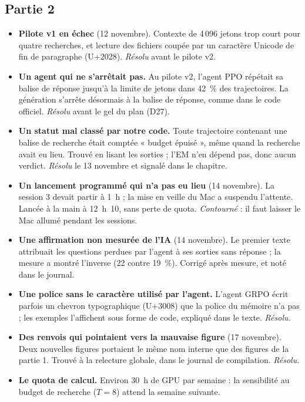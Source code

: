 \documentclass[10pt,a4paper]{article}
\begin{document}
\subsection*{Partie 2}
\begin{itemize}
\item \textbf{Pilote v1 en échec} (12 novembre). Contexte de 4\,096 jetons trop court pour quatre recherches, et lecture des fichiers coupée par un caractère Unicode de fin de paragraphe (U+2028). \emph{Résolu} avant le pilote v2.
\item \textbf{Un agent qui ne s'arrêtait pas.} Au pilote v2, l'agent PPO répétait sa balise de réponse jusqu'à la limite de jetons dans 42~\% des trajectoires. La génération s'arrête désormais à la balise de réponse, comme dans le code officiel. \emph{Résolu} avant le gel du plan (D27).
\item \textbf{Un statut mal classé par notre code.} Toute trajectoire contenant une balise de recherche était comptée « budget épuisé », même quand la recherche avait eu lieu. Trouvé en lisant les sorties ; l'EM n'en dépend pas, donc aucun verdict. \emph{Résolu} le 13 novembre et signalé dans le chapitre.
\item \textbf{Un lancement programmé qui n'a pas eu lieu} (14 novembre). La session 3 devait partir à 1~h ; la mise en veille du Mac a suspendu l'attente. Lancée à la main à 12~h~10, sans perte de quota. \emph{Contourné} : il faut laisser le Mac allumé pendant les sessions.
\item \textbf{Une affirmation non mesurée de l'IA} (14 novembre). Le premier texte attribuait les questions perdues par l'agent à ses sorties sans réponse ; la mesure a montré l'inverse (22 contre 19~\%). Corrigé après mesure, et noté dans le journal.
\item \textbf{Une police sans le caractère utilisé par l'agent.} L'agent GRPO écrit parfois un chevron typographique (U+3008) que la police du mémoire n'a pas ; les exemples l'affichent sous forme de code, expliqué dans le texte. \emph{Résolu.}
\item \textbf{Des renvois qui pointaient vers la mauvaise figure} (17 novembre). Deux nouvelles figures portaient le même nom interne que des figures de la partie 1. Trouvé à la relecture globale, dans le journal de compilation. \emph{Résolu.}
\item \textbf{Le quota de calcul.} Environ 30~h de GPU par semaine : la sensibilité au budget de recherche ($T = 8$) attend la semaine suivante.
\end{itemize}
\end{document}
